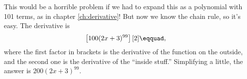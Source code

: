 This would be a horrible problem if we had to expand this as a polynomial with 101 terms,
as in chapter \ref{ch:derivative}! But now we know the chain rule, so it's easy. The derivative is
\begin{equation*}
  \left[100(2x+3)^{99}\right][2]\eqquad,
\end{equation*}
where the first factor in brackets is the derivative of the function on the outside, and
the second one is the derivative of the ``inside stuff.'' Simplifying a little, the
answer is $200(2x+3)^{99}$.

